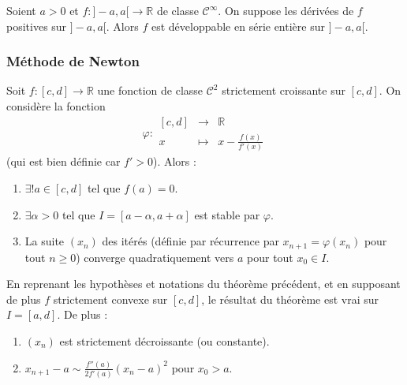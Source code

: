 
  \begin{theorem}
    Soient $a > 0$ et $f : ]-a,a[ \rightarrow \mathbb{R}$ de classe $\mathcal{C}^\infty$. On suppose les dérivées de $f$ positives sur $]-a,a[$. Alors $f$ est développable en série entière sur $]-a,a[$.
  \end{theorem}

  \subsubsection{Méthode de Newton}


  \begin{theorem}
    Soit $f : [c, d] \rightarrow \mathbb{R}$ une fonction de classe $\mathcal{C}^2$ strictement croissante sur $[c, d]$. On considère la fonction
    \[ \varphi :
    \begin{array}{ccc}
      [c, d] &\rightarrow& \mathbb{R} \\
      x &\mapsto& x - \frac{f(x)}{f'(x)}
    \end{array}
    \]
    (qui est bien définie car $f' > 0$). Alors :
    \begin{enumerate}[label={\bfseries(\roman*)}]
      \item $\exists! a \in [c, d]$ tel que $f(a) = 0$.
      \item $\exists \alpha > 0$ tel que $I = [a - \alpha, a + \alpha]$ est stable par $\varphi$.
      \item La suite $(x_n)$ des itérés (définie par récurrence par $x_{n+1} = \varphi(x_n)$ pour tout $n \geq 0$) converge quadratiquement vers $a$ pour tout $x_0 \in I$.
    \end{enumerate}
  \end{theorem}

  \begin{corollary}
    En reprenant les hypothèses et notations du théorème précédent, et en supposant de plus $f$ strictement convexe sur $[c, d]$, le résultat du théorème est vrai sur $I = [a, d]$. De plus :
    \begin{enumerate}[label={\bfseries(\roman*)}]
      \item $(x_n)$ est strictement décroissante (ou constante).
      \item $x_{n+1} - a \sim \frac{f''(a)}{2f'(a)} (x_n - a)^2$ pour $x_0 > a$.
    \end{enumerate}
  \end{corollary}

